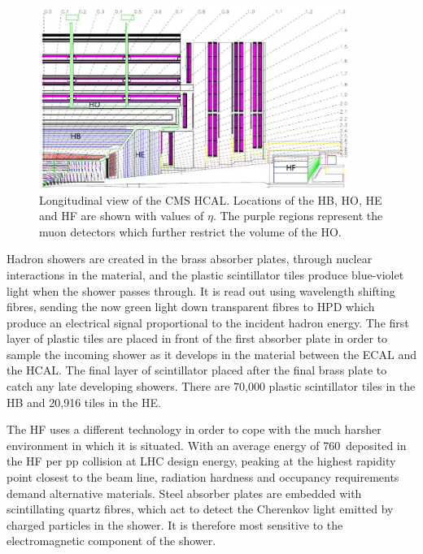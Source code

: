 \begin{figure}[htbp]
  \begin{center}
  \includegraphics[width=0.9\textwidth]{Figures/detector/cmsHCAL}
  \caption{Longitudinal view of the \ac{CMS} \ac{HCAL}. Locations of the \ac{HB}, \ac{HO}, \ac{HE} and \ac{HF} are shown with values of $\eta$. The purple regions represent the muon detectors which further restrict the volume of the \ac{HO}.
}
  \label{fig:CMShcal}
  \end{center}
\end{figure}

Hadron showers are created in the brass absorber plates, through nuclear interactions in the material, and the plastic scintillator tiles produce blue-violet light when the shower passes through. 
It is read out using wavelength shifting fibres, sending the now green light down transparent fibres to \ac{HPD} which produce an electrical signal proportional to the incident hadron energy.
The first layer of plastic tiles are placed in front of the first absorber plate in order to sample the incoming shower as it develops in the material between the \ac{ECAL} and the \ac{HCAL}.
The final layer of scintillator placed after the final brass plate to catch any late developing showers.
There are 70,000 plastic scintillator tiles in the \ac{HB} and 20,916 tiles in the \ac{HE}.

The \ac{HF} uses a different technology in order to cope with the much harsher environment in which it is situated.
With an average energy of 760~\GeV deposited in the \ac{HF} per pp collision at LHC design energy, peaking at the highest rapidity point closest to the beam line, radiation hardness and occupancy requirements demand alternative materials.
Steel absorber plates are embedded with scintillating quartz fibres, which act to detect the Cherenkov light emitted by charged particles in the shower. 
It is therefore most sensitive to the electromagnetic component of the shower.


